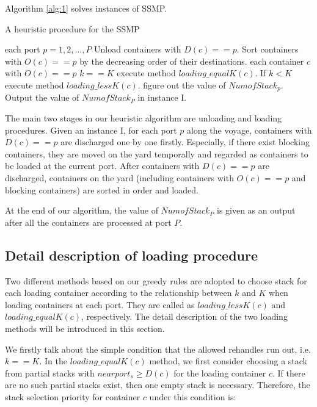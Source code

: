 \documentclass[review,3p,times,authoryear,12pt]{elsarticle}
\begin{document}
Algorithm \ref{alg:1} solves instances of SSMP.

\begin{algorithm}[htbp]
  \caption{A heuristic procedure for the SSMP}
  \label{alg:1}
  \begin{codebox}

    \li \For each port $p=1, 2 , \ldots,P $
    \li \Do
                Unload containers with $D(c)==p$.
    \li         Sort containers with $O(c)==p$ by the decreasing order of their destinations.
    \li         \For each container $c$ with $O(c)==p$
    \li         \Do
                   \If $k==K$
    \li            \Then
                        execute method $loading\_equalK(c)$.
    \li            \Else If $k < K$
    \li                 execute method $loading\_lessK(c)$.
                   \End
                \End
    \li          figure out the value of $NumofStack_p$.
        \End
    \li Output the value of $NumofStack_P$ in instance I.

 \end{codebox}
 \end{algorithm}

The main two stages in our heuristic algorithm are unloading and loading procedures.
Given an instance I, for each port $p$ along the voyage, containers with $D(c)==p$ are discharged one by one firstly.
Especially, if there exist blocking containers, they are moved on the yard temporally and regarded as containers to be loaded at the current port.
After containers with $D(c)==p$ are discharged, containers on the yard (including containers with $O(c)==p$ and blocking containers) are sorted in order and loaded.

At the end of our algorithm, the value of $NumofStack_P$ is given as an output after all the containers are processed at port $P$.

\subsection{Detail description of loading procedure}
\label{sec:d2}

Two different methods based on our greedy rules are adopted to choose stack for each loading container according to the relationship between $k$ and $K$ when loading containers at each port.
They are called as $loading\_lessK(c)$ and $loading\_equalK(c)$, respectively.
The detail description of the two loading methods will be introduced in this section.

We firstly talk about the simple condition that the allowed rehandles run out, i.e. $k==K$.
In the $loading\_equalK(c)$ method, we first consider choosing a stack from partial stacks with $nearport_s \ge D(c)$ for the loading container $c$.
If there are no such partial stacks exist, then one empty stack is necessary.
Therefore, the stack selection priority for container $c$ under this condition is:
\end{document}
